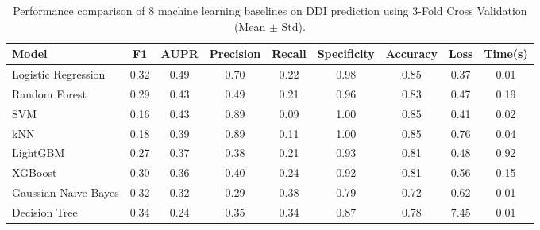 \begin{table}[htbp]
\centering
\caption{Performance comparison of 8 machine learning baselines on DDI prediction using 3-Fold Cross Validation (Mean $\pm$ Std).}
\label{tab:ddi_baselines_cv}
\begin{tabular}{lcccccccc}
\toprule
Model & F1 & AUPR & Precision & Recall & Specificity & Accuracy & Loss & Time(s) \\
\midrule
Logistic Regression & 0.32 & 0.49 & 0.70 & 0.22 & 0.98 & 0.85 & 0.37 & 0.01 \\
Random Forest & 0.29 & 0.43 & 0.49 & 0.21 & 0.96 & 0.83 & 0.47 & 0.19 \\
SVM & 0.16 & 0.43 & 0.89 & 0.09 & 1.00 & 0.85 & 0.41 & 0.02 \\
kNN & 0.18 & 0.39 & 0.89 & 0.11 & 1.00 & 0.85 & 0.76 & 0.04 \\
LightGBM & 0.27 & 0.37 & 0.38 & 0.21 & 0.93 & 0.81 & 0.48 & 0.92 \\
XGBoost & 0.30 & 0.36 & 0.40 & 0.24 & 0.92 & 0.81 & 0.56 & 0.15 \\
Gaussian Naive Bayes & 0.32 & 0.32 & 0.29 & 0.38 & 0.79 & 0.72 & 0.62 & 0.01 \\
Decision Tree & 0.34 & 0.24 & 0.35 & 0.34 & 0.87 & 0.78 & 7.45 & 0.01 \\
\bottomrule
\end{tabular}
\end{table}